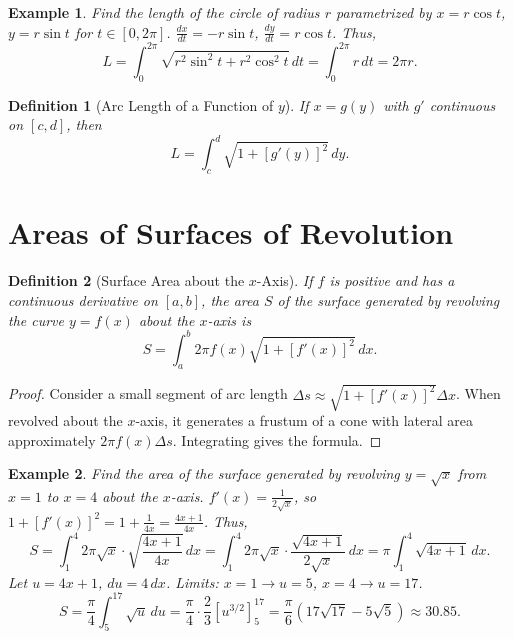 \documentclass[11pt,a4paper]{article}
\newtheorem{example}{Example}
\newtheorem{definition}{Definition}
\begin{document}
\begin{example}
Find the length of the circle of radius $r$ parametrized by $x = r \cos t$, $y = r \sin t$ for $t \in [0, 2\pi]$.
$\frac{dx}{dt} = -r \sin t$, $\frac{dy}{dt} = r \cos t$. Thus,
\[
L = \int_0^{2\pi} \sqrt{r^2 \sin^2 t + r^2 \cos^2 t} \, dt = \int_0^{2\pi} r \, dt = 2\pi r.
\]
\end{example}
\begin{definition}[Arc Length of a Function of $y$]
If $x = g(y)$ with $g'$ continuous on $[c, d]$, then
\[
L = \int_c^d \sqrt{1 + [g'(y)]^2} \, dy.
\]
\end{definition}
\section{Areas of Surfaces of Revolution}
\begin{definition}[Surface Area about the $x$-Axis]
If $f$ is positive and has a continuous derivative on $[a, b]$, the area $S$ of the surface generated by revolving the curve $y = f(x)$ about the $x$-axis is
\[
S = \int_a^b 2\pi f(x) \sqrt{1 + [f'(x)]^2} \, dx.
\]
\end{definition}
\begin{proof}
Consider a small segment of arc length $\Delta s \approx \sqrt{1 + [f'(x)]^2} \Delta x$. When revolved about the $x$-axis, it generates a frustum of a cone with lateral area approximately $2\pi f(x) \Delta s$. Integrating gives the formula.
\end{proof}
\begin{center}
\end{center}
\begin{example}
Find the area of the surface generated by revolving $y = \sqrt{x}$ from $x = 1$ to $x = 4$ about the $x$-axis.
$f'(x) = \frac{1}{2\sqrt{x}}$, so $1 + [f'(x)]^2 = 1 + \frac{1}{4x} = \frac{4x + 1}{4x}$. Thus,
\[
S = \int_1^4 2\pi \sqrt{x} \cdot \sqrt{\frac{4x+1}{4x}} \, dx = \int_1^4 2\pi \sqrt{x} \cdot \frac{\sqrt{4x+1}}{2\sqrt{x}} \, dx = \pi \int_1^4 \sqrt{4x+1} \, dx.
\]
Let $u = 4x + 1$, $du = 4 \, dx$. Limits: $x = 1 \to u = 5$, $x = 4 \to u = 17$.
\[
S = \frac{\pi}{4} \int_5^{17} \sqrt{u} \, du = \frac{\pi}{4} \cdot \frac{2}{3} [u^{3/2}]_5^{17} = \frac{\pi}{6} (17\sqrt{17} - 5\sqrt{5}) \approx 30.85.
\]
\end{example}
\end{document}
